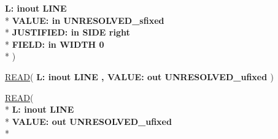 \begin{DoxyCompactItemize}
{\bfseries \textcolor{vhdlchar}{ }\textcolor{vhdlchar}{L\+: }\textcolor{stringliteral}{} {\bfseries \textcolor{keywordflow}{inout}\textcolor{vhdlchar}{ }\textcolor{vhdlchar}{L\+I\+N\+E}\textcolor{vhdlchar}{ }}}\\*
  {\bfseries \textcolor{vhdlchar}{ }\textcolor{vhdlchar}{V\+A\+L\+U\+E\+: }\textcolor{stringliteral}{} {\bfseries \textcolor{keywordflow}{in}\textcolor{vhdlchar}{ }\textcolor{vhdlchar}{U\+N\+R\+E\+S\+O\+L\+V\+E\+D\+\_\+sfixed}\textcolor{vhdlchar}{ }}}\\*
  {\bfseries \textcolor{vhdlchar}{ }\textcolor{vhdlchar}{J\+U\+S\+T\+I\+F\+I\+E\+D\+: }\textcolor{stringliteral}{} {\bfseries \textcolor{keywordflow}{in}\textcolor{vhdlchar}{ }\textcolor{vhdlchar}{S\+I\+D\+E}\textcolor{vhdlchar}{ }\textcolor{vhdlchar}{ }\textcolor{vhdlchar}{ }\textcolor{vhdlchar}{ }\textcolor{vhdlchar}{ }\textcolor{vhdlkeyword}{right}\textcolor{vhdlchar}{ }}}\\*
  {\bfseries \textcolor{vhdlchar}{ }\textcolor{vhdlchar}{F\+I\+E\+L\+D\+: }\textcolor{stringliteral}{} {\bfseries \textcolor{keywordflow}{in}\textcolor{vhdlchar}{ }\textcolor{vhdlchar}{W\+I\+D\+T\+H}\textcolor{vhdlchar}{ }\textcolor{vhdlchar}{ }\textcolor{vhdlchar}{ } \textcolor{vhdldigit}{0} \textcolor{vhdlchar}{ }}}\\*
   )
\item 
{\bfseries {\bfseries \textcolor{vhdlchar}{ }}} \hyperlink{class__fixed__pkg_a1b1262258b9fb1a68fec2aad83940efe}{R\+E\+A\+D}( {\bfseries \textcolor{vhdlchar}{ }\textcolor{vhdlchar}{L\+: }\textcolor{stringliteral}{} {\bfseries \textcolor{keywordflow}{inout}\textcolor{vhdlchar}{ }\textcolor{vhdlchar}{L\+I\+N\+E}\textcolor{vhdlchar}{ }}}{\bfseries ,\textcolor{vhdlchar}{ }\textcolor{vhdlchar}{V\+A\+L\+U\+E\+: }\textcolor{stringliteral}{} {\bfseries \textcolor{keywordflow}{out}\textcolor{vhdlchar}{ }\textcolor{vhdlchar}{U\+N\+R\+E\+S\+O\+L\+V\+E\+D\+\_\+ufixed}\textcolor{vhdlchar}{ }}} )
\item 
{\bfseries {\bfseries \textcolor{vhdlchar}{ }}} \hyperlink{class__fixed__pkg_ae7e16de39ab0d01050084742fd86814f}{R\+E\+A\+D}( \\*
{\bfseries \textcolor{vhdlchar}{ }\textcolor{vhdlchar}{L\+: }\textcolor{stringliteral}{} {\bfseries \textcolor{keywordflow}{inout}\textcolor{vhdlchar}{ }\textcolor{vhdlchar}{L\+I\+N\+E}\textcolor{vhdlchar}{ }}}\\*
  {\bfseries \textcolor{vhdlchar}{ }\textcolor{vhdlchar}{V\+A\+L\+U\+E\+: }\textcolor{stringliteral}{} {\bfseries \textcolor{keywordflow}{out}\textcolor{vhdlchar}{ }\textcolor{vhdlchar}{U\+N\+R\+E\+S\+O\+L\+V\+E\+D\+\_\+ufixed}\textcolor{vhdlchar}{ }}}\\*

\end{DoxyCompactItemize}
